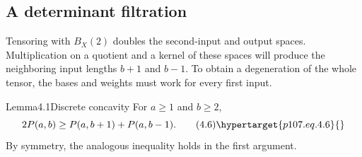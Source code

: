 \subsection{A determinant filtration}\hypertarget{p107.sec.4.1}{}
Tensoring with $B_X(2)$ doubles the second-input and output spaces. Multiplication on a quotient and a kernel of these spaces will produce the neighboring input lengths $b+1$ and $b-1$. To obtain a degeneration of the whole tensor, the bases and weights must work for every first input.

\begin{result}{Lemma}{4.1}{Discrete concavity}
For $a\ge1$ and $b\ge2$,
\begin{equation}
2P(a,b)\ge P(a,b+1)+P(a,b-1).\tag{4.6}\hypertarget{p107.eq.4.6}{}
\end{equation}
By symmetry, the analogous inequality holds in the first argument.
\end{result}
